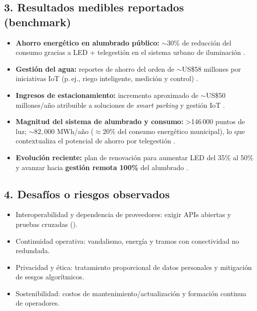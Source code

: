 \documentclass[12pt,a4paper]{article}
\begin{document}
\subsection*{3. Resultados medibles reportados (benchmark)}
\begin{itemize}
  \item \textbf{Ahorro energético en alumbrado público:} \(\sim 30\%\) de reducción del consumo gracias a LED + telegestión en el sistema urbano de iluminación \cite{harvardAsh}. 
  \item \textbf{Gestión del agua:} reportes de ahorro del orden de \(\sim\)US\$58 millones por iniciativas IoT (p.\,ej., riego inteligente, medición y control) \cite{harvardAsh}. 
  \item \textbf{Ingresos de estacionamiento:} incremento aproximado de \(\sim\)US\$50 millones/año atribuible a soluciones de \textit{smart parking} y gestión IoT \cite{harvardAsh}.
  \item \textbf{Magnitud del sistema de alumbrado y consumo:} >146\,000 puntos de luz; \(\sim 82{,}000\) MWh/año (\(\approx 20\%\) del consumo energético municipal), lo que contextualiza el potencial de ahorro por telegestión \cite{ajuntamentStreetLighting}. 
  \item \textbf{Evolución reciente:} plan de renovación para aumentar LED del 35\% al 50\% y avanzar hacia \textbf{gestión remota 100\%} del alumbrado \cite{ajuntamentRenewLighting}.
\end{itemize}

\subsection*{4. Desafíos o riesgos observados}
\begin{itemize}
  \item Interoperabilidad y dependencia de proveedores: exigir APIs abiertas y pruebas cruzadas (\cite{sentiloCaseStudy}).
  \item Continuidad operativa: vandalismo, energía y tramos con conectividad no redundada.
  \item Privacidad y ética: tratamiento proporcional de datos personales y mitigación de sesgos algorítmicos.
  \item Sostenibilidad: costos de mantenimiento/actualización y formación continua de operadores.
\end{itemize}
\end{document}
